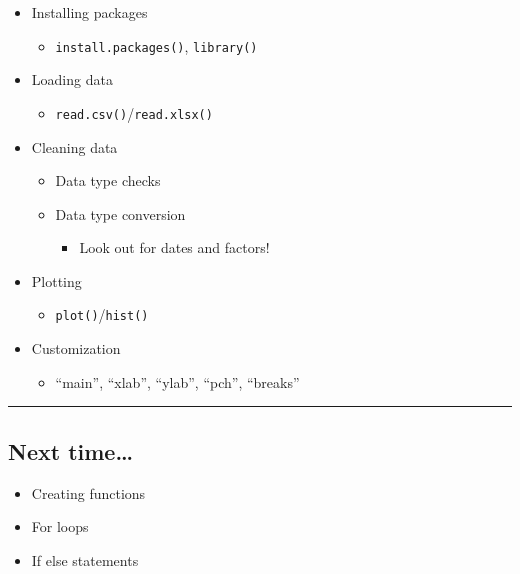 \documentclass[]{article}
\providecommand{\tightlist}{%
  \setlength{\itemsep}{0pt}\setlength{\parskip}{0pt}}
\begin{document}
\begin{itemize}
\tightlist
\item
  Installing packages

  \begin{itemize}
  \tightlist
  \item
    \texttt{install.packages()}, \texttt{library()}
  \end{itemize}
\item
  Loading data

  \begin{itemize}
  \tightlist
  \item
    \texttt{read.csv()}/\texttt{read.xlsx()}
  \end{itemize}
\item
  Cleaning data

  \begin{itemize}
  \tightlist
  \item
    Data type checks
  \item
    Data type conversion

    \begin{itemize}
    \tightlist
    \item
      Look out for dates and factors!
    \end{itemize}
  \end{itemize}
\item
  Plotting

  \begin{itemize}
  \tightlist
  \item
    \texttt{plot()}/\texttt{hist()}
  \end{itemize}
\item
  Customization

  \begin{itemize}
  \tightlist
  \item
    ``main'', ``xlab'', ``ylab'', ``pch'', ``breaks''
  \end{itemize}
\end{itemize}

\begin{center}\rule{0.5\linewidth}{\linethickness}\end{center}

\hypertarget{next-time}{%
\subsection{Next time\ldots{}}\label{next-time}}

\begin{itemize}
\tightlist
\item
  Creating functions
\item
  For loops
\item
  If else statements
\end{itemize}
\end{document}
